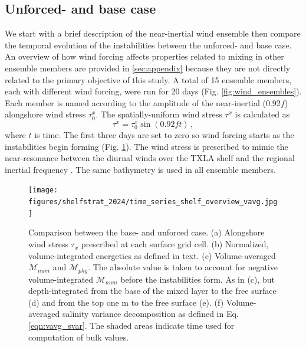 \subsection{Unforced- and base case}
We start with a brief description of the near-inertial wind ensemble then compare the temporal evolution of the instabilities between the unforced- and base case. An overview of how wind forcing affects properties related to mixing in other ensemble members are provided in \ref{sec:appendix} because they are not directly related to the primary objective of this study. A total of 15 ensemble members, each with different wind forcing, were run for 20 days (Fig. \ref{fig:wind_ensembles}). Each member is named according to the amplitude of the near-inertial (0.92$f$) alongshore wind stress $\tau_0^x$. The spatially-uniform wind stress $\tau^x$ is calculated as
\begin{equation}
    \tau^x = \tau_0^x \sin(0.92 f t) \, , 
\end{equation}
where $t$ is time. The first three days are set to zero so wind forcing starts as the instabilities begin forming (Fig. \ref{fig:time_series_base}). The wind stress is prescribed to mimic the near-resonance between the diurnal winds over the TXLA shelf and the regional inertial frequency \citep{Qu_2022_NIW}. The same bathymetry is used in all ensemble members.

\begin{figure}[t!]
    \begin{center}
    \texttt{[image: figures/shelfstrat\_2024/time\_series\_shelf\_overview\_vavg.jpg]}\\
    \caption{Comparison between the base- and unforced case. (a) Alongshore wind stress $\tau_x$ prescribed at each surface grid cell. (b) Normalized, volume-integrated energetics as defined in text. (c) Volume-averaged $\mathcal{M}_{num}$ and $\mathcal{M}_{phy}$. The absolute value is taken to account for negative volume-integrated $\mathcal{M}_{num}$ before the instabilities form. As in (c), but depth-integrated from the base of the mixed layer to the free surface (d) and from the top one m to the free surface (e). (f) Volume-averaged salinity variance decomposition as defined in Eq. \ref{eqn:vavg_svar}. The shaded areas indicate time used for computation of bulk values.}\label{fig:time_series_base}
     \end{center}
\end{figure} 

